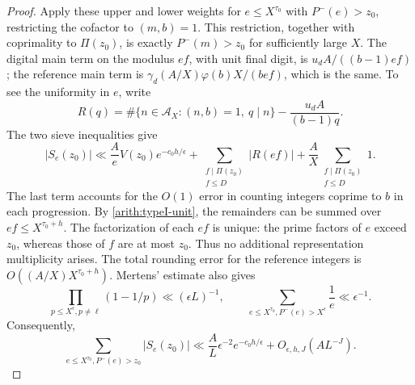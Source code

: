 \documentclass[11pt,a4paper]{article}
\theoremstyle{paperplain}
\numberwithin{equation}{section}
\begin{document}
\begin{proof}
Apply these upper and lower weights for $e\le X^{\tau_0}$ with
$P^-(e)>z_0$, restricting the cofactor to $(m,b)=1$.
This restriction, together with coprimality to $\Pi(z_0)$, is
exactly $P^-(m)>z_0$ for sufficiently large $X$.
The digital main term on the modulus $ef$, with unit final digit, is
$u_dA/((b-1)ef)$; the reference main term is
$\gamma_d(A/X)\varphi(b)X/(bef)$, which is the same.
To see the uniformity in $e$, write
\[
 R(q)=\#\{n\in\mathcal A_X:(n,b)=1,\ q\mid n\}
       -\frac{u_dA}{(b-1)q}.
\]
The two sieve inequalities give
\[
 |S_e(z_0)|\ll
 \frac{A}{e}V(z_0)e^{-c_0h/\epsilon}
 +\sum_{\substack{f\mid\Pi(z_0)\\f\le D}}|R(ef)|
 +\frac AX\sum_{\substack{f\mid\Pi(z_0)\\f\le D}}1.
\]
The last term accounts for the $O(1)$ error in counting integers
coprime to $b$ in each progression.
By \eqref{arith:typeI-unit}, the remainders can be summed over
$ef\le X^{\tau_0+h}$.
The factorization of each $ef$ is unique: the prime factors of $e$
exceed $z_0$, whereas those of $f$ are at most $z_0$. Thus no additional
representation multiplicity arises.
The total rounding error for the reference integers is
$O((A/X)X^{\tau_0+h})$.
Mertens' estimate also gives
\[
 \prod_{p\le X^\epsilon,p\ne\ell}(1-1/p)\ll(\epsilon L)^{-1},
 \qquad \sum_{e\le X^{\tau_0},P^-(e)>X^\epsilon}\frac1e
       \ll\epsilon^{-1}.
\]
Consequently,
\begin{equation}\label{arith:fundamental}
 \sum_{e\le X^{\tau_0},P^-(e)>z_0}|S_e(z_0)|
 \ll \frac AL\epsilon^{-2}e^{-c_0h/\epsilon}
           +O_{\epsilon,h,J}(AL^{-J}).
\end{equation}


\end{proof}
\end{document}
